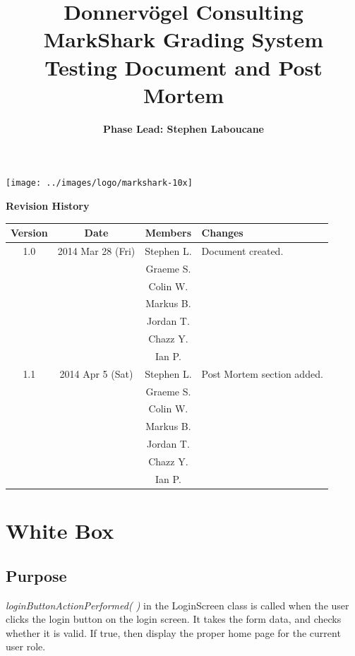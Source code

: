 \documentclass{article}
\begin{document}
\title{Donnervögel Consulting \\ MarkShark Grading System \\ Testing Document and Post Mortem}
\author{\textbf{Phase Lead: Stephen Laboucane}}
\maketitle
\centerline{\texttt{[image: ../images/logo/markshark-10x]}}
\clearpage

\textbf{Revision History}
\begin{center}
  \begin{tabular}{| c | c | c | l |}
    \hline
    Version & Date & Members & Changes\\
    \hline
    1.0 & 2014 Mar 28 (Fri) & Stephen L. & Document created.\\
    & & Graeme S. & \\
    & & Colin W. &\\
    & & Markus B.&\\
    & & Jordan T. &\\
	& & Chazz Y. &\\
    & & Ian P. &\\
    \hline
    1.1 & 2014 Apr 5 (Sat) & Stephen L. & Post Mortem section added.\\
    & & Graeme S. & \\
    & & Colin W. &\\
    & & Markus B.&\\
    & & Jordan T. &\\
    & & Chazz Y. &\\
    & & Ian P. &\\
    \hline
  \end{tabular}
\end{center}
\clearpage

\tableofcontents
\clearpage

\section{White Box} 
\subsection{Purpose}
\textit{loginButtonActionPerformed( )} in the LoginScreen class is called when the user clicks the login button on the login screen.  It takes the form data, and checks whether it is valid.  If true, then display the proper home page for the current user role.
\end{document}
